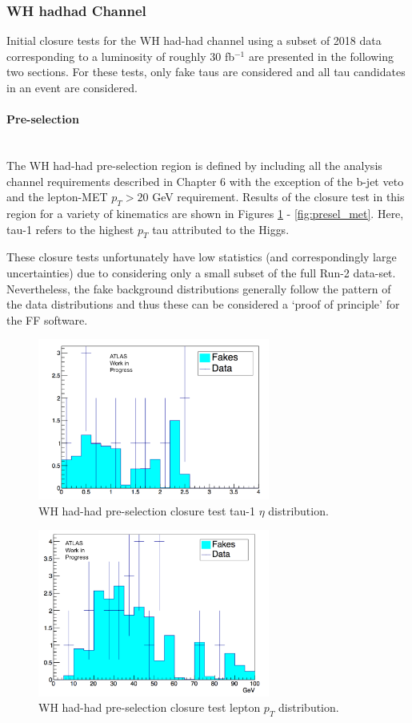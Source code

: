\subsubsection{WH hadhad Channel}
Initial closure tests for the WH had-had channel using a subset of 2018 data corresponding to a luminosity of roughly 30 fb$^{-1}$ are presented in the following two sections. For these tests, only fake taus are considered and all tau candidates in an event are considered.

\paragraph{Pre-selection}\mbox{} \\
The WH had-had pre-selection region is defined by including all the analysis channel requirements described in Chapter 6 with the exception of the b-jet veto and the lepton-MET $p_T>20$ GeV requirement. Results of the closure test in this region for a variety of kinematics are shown in Figures \ref{fig:presel_taueta} - \ref{fig:presel_met}. Here, tau-1 refers to the highest $p_T$ tau attributed to the Higgs.

These closure tests unfortunately have low statistics (and correspondingly large uncertainties) due to considering only a small subset of the full Run-2 data-set.  Nevertheless, the fake background distributions generally follow the pattern of the data distributions and thus these can be considered a `proof of principle' for the FF software.

\begin{figure}[htb!]
    \centering
    \includegraphics[width=3in]{figures/chapter7/tau1_eta_whpresel.png}
    \caption{WH had-had pre-selection closure test tau-1 $\eta$ distribution.}
    \label{fig:presel_taueta}
\end{figure}

\begin{figure}[htb!]
    \centering
    \includegraphics[width=3in]{figures/chapter7/lep_pt_wh_presel.png}
    \caption{WH had-had pre-selection closure test lepton $p_T$ distribution.}
    \label{fig:presel_leppt}
\end{figure}

